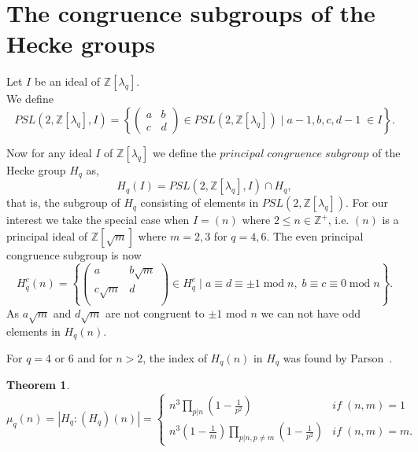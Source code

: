 \documentclass{amsproc}
\numberwithin{equation}{section}
\numberwithin{equation}{section}
\newtheorem{theorem}{Theorem}[section]
\theoremstyle{definition}
\theoremstyle{remark}
\numberwithin{equation}{section}
\begin{document}
 \section{The congruence subgroups of the Hecke groups}
Let $I$ be an ideal of  $\mathbb Z[\lambda_{q}]$.\\We define
 \begin{equation*}
  PSL(2,\mathbb Z[\lambda_{q}],I) = \left\{ \left(
  \begin{matrix}
    a & b \\ c & d 
  \end{matrix}
  \right) \in PSL(2,\mathbb Z[\lambda_{q}]) \; |\;  a-1,b,c,d-1\;\in I
  \right\}.
\end{equation*}

Now for any ideal $I$ of  $\mathbb Z[\lambda_{q}]$ we define the $\mathit{ principal\; congruence \;subgroup}$ of the Hecke group $H_{q}$ as, $$H_{q}(I)=PSL(2,\mathbb Z[\lambda_{q}],I) \cap H_{q},$$ that is, the subgroup of $H_{q}$ consisting of elements in $PSL(2,\mathbb Z[\lambda_{q}])$.  For our interest we take the special case when $I=(n)$ where $2\leq n\in \mathbb{Z}^+$, i.e. $(n)$ is a principal ideal of $\mathbb{Z}[\sqrt{m}]$ where $m=2,3$ for $q=4,6$. The even principal congruence subgroup is now    \begin{equation}
  H_q^e(n) = \left\{ \left(
   \begin{matrix}
    a    & b \sqrt{m} \\
   c \sqrt{m}     & d \\
  \end{matrix}
  \right) \in H_q^e \; |\; a\equiv d \equiv \pm 1 \;  \text{mod}\; n, \; b\equiv c \equiv  0 \;   \text{mod}\; n
  \right\}.
  \label{h:1}
\end{equation}  
As  $a\sqrt{m}$ and $d\sqrt{m}$  are not congruent to $ \pm 1$ mod $n$ we can not have odd elements in $H_q(n).$

\vspace{1cm}




For $q=$4 or 6 and for $n>2$, the index of $H_q(n)$ in $H_q$ was found by Parson~\cite[Theorem 2.3]{Par76}.
\vspace{1cm}

\begin{theorem}\label{p} 
 \begin{equation}
\label{dk1c}
\mu_q(n)=|H_q:(H_q)(n)|= \begin{cases}
                           n^3   \prod_{p|n} (1-\frac{1}{p^2})             &if \; (n,m)=1\\
               n^3 (1-\frac{1}{m})   \prod_{p|n,p\neq m} (1-\frac{1}{p^2})               &if \; (n,m)=m.
           \end{cases}
\end{equation}
 
\end{theorem}   
\vspace{1cm}
\end{document}
